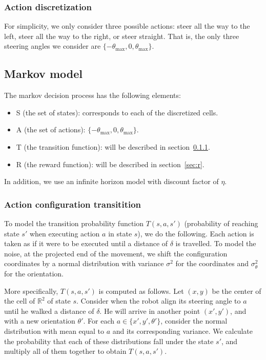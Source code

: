 \documentclass[a4paper]{article}
\begin{document}
\subsubsection{Action discretization}
For simplicity, we only consider three possible actions: steer all the way
to the left, steer all the way to the right, or steer straight. That is,
the only three steering angles we consider are $\{-\theta_\text{max}, 0, \theta_\text{max}\}$.

\subsection{Markov model}
The markov decision process has the following elements:
\begin{itemize}
  \item S (the set of states): corresponds to each of the discretized cells.
  \item A (the set of actions): $\{-\theta_\text{max}, 0, \theta_\text{max}\}$.
  \item T (the transition function): will be described in section~\ref{sec:t}.
  \item R (the reward function): will be described in section~\ref{sec:r}.
\end{itemize}

In addition, we use an infinite horizon model with discount factor of $\eta$.

\subsubsection{Action configuration transitition}
\label{sec:t}
To model the transition probability function $T(s, a, s')$ (probability of
reaching state $s'$ when executing action $a$ in state $s$), we do the following.
Each action is taken as if it were to be executed until a distance of $\delta$
is travelled. To model the noise, at the projected end of the movement, we
shift the configuration coordinates by a normal distribution with variance
$\sigma^2$ for the coordinates and $\sigma_\theta^2$ for the orientation.

More specifically, $T(s, a, s')$ is computed as follows. Let $(x, y)$ be the
center of the cell of $\mathbb{R}^2$ of state $s$. Consider when the robot
align its steering angle to $a$ until he walked a distance of $\delta$. He
will arrive in another point $(x', y')$, and with a new orientation $\theta'$.
For each $a \in \{x', y', \theta'\}$, consider the normal distribution
with mean equal to $a$ and its corresponding variance. We calculate the probability
that each of these distributions fall under the state $s'$, and multiply all
of them together to obtain $T(s, a, s')$.
\end{document}
